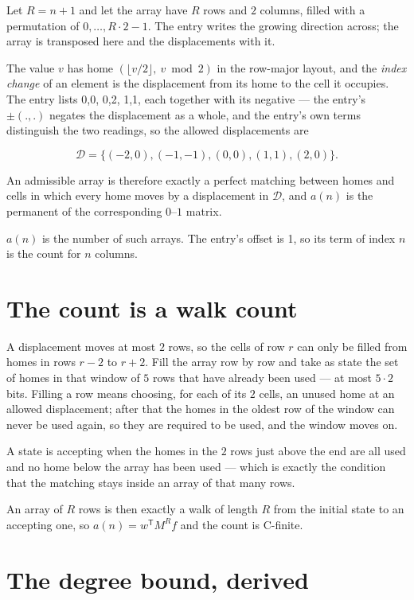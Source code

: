 \documentclass[11pt]{article}
\theoremstyle{definition}
\begin{document}
Let $R = n + 1$ and let the array have $R$ rows and $2$ columns, filled with a permutation of $0,\dots,R\cdot2-1$. The entry writes the growing direction across; the array is transposed here and the displacements with it.

The value $v$ has home $(\lfloor v/2\rfloor,\ v \bmod 2)$ in the row-major layout, and the {\itshape index change} of an element is the displacement from its home to the cell it occupies. The entry lists 0,0, 0,2, 1,1, each together with its negative --- the entry's $\pm(.,.)$ negates the displacement as a whole, and the entry's own terms distinguish the two readings, so the allowed displacements are

\[\mathcal{D} = \{(-2,0), (-1,-1), (0,0), (1,1), (2,0)\}.\]

An admissible array is therefore exactly a perfect matching between homes and cells in which every home moves by a displacement in $\mathcal{D}$, and $a(n)$ is the permanent of the corresponding $0$--$1$ matrix.

$a(n)$ is the number of such arrays. The entry's offset is 1, so its term of index $n$ is the count for $n$ columns.

\section{The count is a walk count}

A displacement moves at most $2$ rows, so the cells of row $r$ can only be filled from homes in rows $r-2$ to $r+2$. Fill the array row by row and take as state the set of homes in that window of $5$ rows that have already been used --- at most $5\cdot2$ bits. Filling a row means choosing, for each of its $2$ cells, an unused home at an allowed displacement; after that the homes in the oldest row of the window can never be used again, so they are required to be used, and the window moves on.

A state is accepting when the homes in the $2$ rows just above the end are all used and no home below the array has been used --- which is exactly the condition that the matching stays inside an array of that many rows.

An array of $R$ rows is then exactly a walk of length $R$ from the initial state to an accepting one, so $a(n) = w^{\mathsf T}M^{R}f$ and the count is C-finite.

\section{The degree bound, derived}
\end{document}
